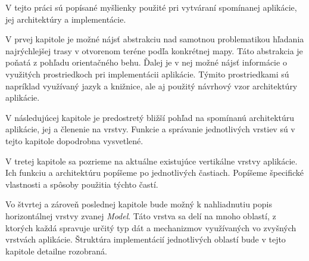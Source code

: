 \bigskip

V tejto práci sú popísané myšlienky použité pri vytváraní spomínanej aplikácie, jej architektúry a implementácie.

V prvej kapitole je možné nájsť abstrakciu nad samotnou problematikou hľadania najrýchlejšej trasy v otvorenom teréne podľa konkrétnej mapy. Táto abstrakcia je poňatá z pohľadu orientačného behu. Ďalej je v nej možné nájsť informácie o využitých prostriedkoch pri implementácii aplikácie. Týmito prostriedkami sú napríklad využívaný jazyk a knižnice, ale aj použitý návrhový vzor architektúry aplikácie. 

V následujúcej kapitole je predostretý bližší pohľad na spomínanú architektúru aplikácie, jej  a  členenie na vrstvy. Funkcie a správanie jednotlivých vrstiev sú v tejto kapitole dopodrobna vysvetlené.

V tretej kapitole sa pozrieme na aktuálne existujúce vertikálne vrstvy aplikácie. Ich funkciu a architektúru popíšeme po jednotlivých častiach. Popíšeme špecifické vlastnosti a spôsoby použitia týchto častí. 

Vo štvrtej a zároveň poslednej kapitole bude možný k nahliadnutiu popis horizontálnej vrstvy zvanej \textit{Model}. Táto vrstva sa delí na mnoho oblastí, z ktorých každá spravuje určitý typ dát a mechanizmov využívaných vo zvyšných vrstvách aplikácie. Štruktúra implementácií jednotlivých oblastí bude v tejto kapitole detailne rozobraná.